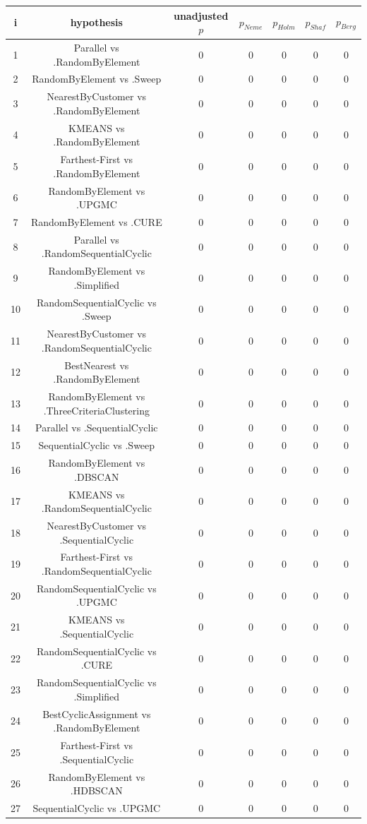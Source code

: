 \documentclass[a4paper,10pt]{article}
\begin{document}
\begin{landscape}
\begin{table}[!htp]
\centering\scriptsize
\begin{tabular}{ccccccc}
i&hypothesis&unadjusted $p$&$p_{Neme}$&$p_{Holm}$&$p_{Shaf}$&$p_{Berg}$\\
\hline1&Parallel vs .RandomByElement&0&0&0&0&0\\
2&RandomByElement vs .Sweep&0&0&0&0&0\\
3&NearestByCustomer vs .RandomByElement&0&0&0&0&0\\
4&KMEANS vs .RandomByElement&0&0&0&0&0\\
5&Farthest-First vs .RandomByElement&0&0&0&0&0\\
6&RandomByElement vs .UPGMC&0&0&0&0&0\\
7&RandomByElement vs .CURE&0&0&0&0&0\\
8&Parallel vs .RandomSequentialCyclic&0&0&0&0&0\\
9&RandomByElement vs .Simplified&0&0&0&0&0\\
10&RandomSequentialCyclic vs .Sweep&0&0&0&0&0\\
11&NearestByCustomer vs .RandomSequentialCyclic&0&0&0&0&0\\
12&BestNearest vs .RandomByElement&0&0&0&0&0\\
13&RandomByElement vs .ThreeCriteriaClustering&0&0&0&0&0\\
14&Parallel vs .SequentialCyclic&0&0&0&0&0\\
15&SequentialCyclic vs .Sweep&0&0&0&0&0\\
16&RandomByElement vs .DBSCAN&0&0&0&0&0\\
17&KMEANS vs .RandomSequentialCyclic&0&0&0&0&0\\
18&NearestByCustomer vs .SequentialCyclic&0&0&0&0&0\\
19&Farthest-First vs .RandomSequentialCyclic&0&0&0&0&0\\
20&RandomSequentialCyclic vs .UPGMC&0&0&0&0&0\\
21&KMEANS vs .SequentialCyclic&0&0&0&0&0\\
22&RandomSequentialCyclic vs .CURE&0&0&0&0&0\\
23&RandomSequentialCyclic vs .Simplified&0&0&0&0&0\\
24&BestCyclicAssignment vs .RandomByElement&0&0&0&0&0\\
25&Farthest-First vs .SequentialCyclic&0&0&0&0&0\\
26&RandomByElement vs .HDBSCAN&0&0&0&0&0\\
27&SequentialCyclic vs .UPGMC&0&0&0&0&0\\

\end{tabular}
\end{table}
\end{landscape}
\end{document}
